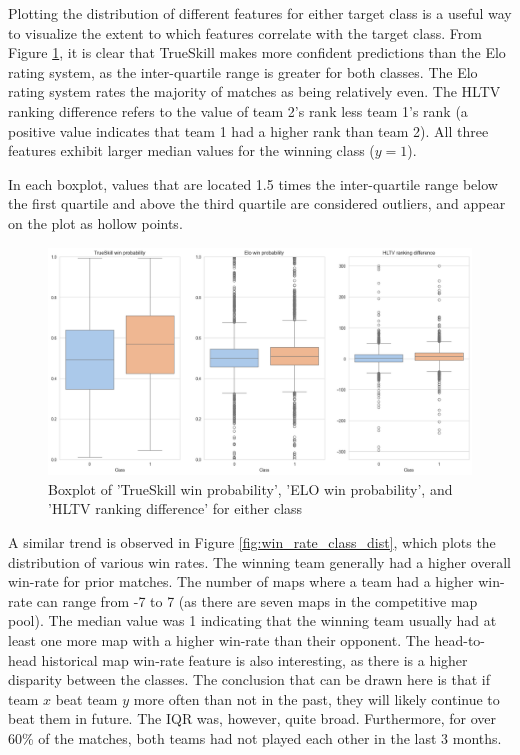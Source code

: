 Plotting the distribution of different features for either target class is a useful way to visualize the extent to which features correlate with the target class. From Figure \ref{fig:win_prob_class_dist}, it is clear that TrueSkill makes more confident predictions than the Elo rating system, as the inter-quartile range is greater for both classes. The Elo rating system rates the majority of matches as being relatively even. The HLTV ranking difference refers to the value of team 2's rank less team 1's rank (a positive value indicates that team 1 had a higher rank than team 2). All three features exhibit larger median values for the winning class ($y=1$).

In each boxplot, values that are located 1.5 times the inter-quartile range below the first quartile and above the third quartile are considered outliers, and appear on the plot as hollow points.

\begin{figure}[h]
	\centering
	\begin{adjustbox}{center}
			\includegraphics[width=1.2\textwidth]{Figures/class-box-new-1.png}
	\end{adjustbox}
	\caption{Boxplot of 'TrueSkill win probability', 'ELO win probability', and 'HLTV ranking difference' for either class}
	\label{fig:win_prob_class_dist}
\end{figure}

A similar trend is observed in Figure \ref{fig:win_rate_class_dist}, which plots the distribution of various win rates. The winning team generally had a higher overall win-rate for prior matches. The number of maps where a team had a higher win-rate can range from -7 to 7 (as there are seven maps in the competitive map pool). The median value was 1 indicating that the winning team usually had at least one more map with a higher win-rate than their opponent. The head-to-head historical map win-rate feature is also interesting, as there is a higher disparity between the classes. The conclusion that can be drawn here is that if team $x$ beat team $y$ more often than not in the past, they will likely continue to beat them in future. The IQR was, however, quite broad. Furthermore, for over 60\% of the matches, both teams had not played each other in the last 3 months.


